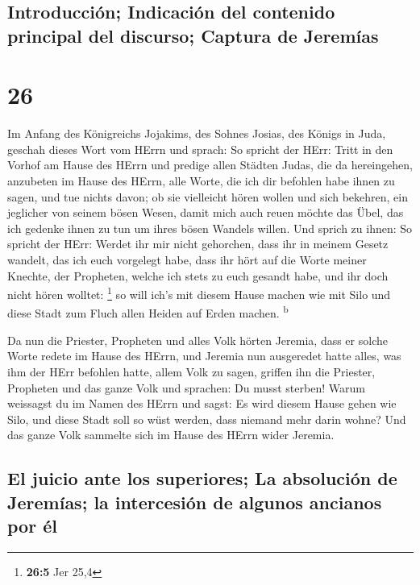 \hypertarget{introducciuxf3n-indicaciuxf3n-del-contenido-principal-del-discurso-captura-de-jeremuxedas}{%
\subsection{Introducción; Indicación del contenido principal del
discurso; Captura de
Jeremías}\label{introducciuxf3n-indicaciuxf3n-del-contenido-principal-del-discurso-captura-de-jeremuxedas}}

\hypertarget{section-25}{%
\section{26}\label{section-25}}

 Im Anfang des Königreichs Jojakims, des Sohnes Josias,
des Königs in Juda, geschah dieses Wort vom HErrn und sprach:
 So spricht der HErr: Tritt in den Vorhof am Hause des
HErrn und predige allen Städten Judas, die da hereingehen, anzubeten im
Hause des HErrn, alle Worte, die ich dir befohlen habe ihnen zu sagen,
und tue nichts davon;  ob sie vielleicht hören wollen und
sich bekehren, ein jeglicher von seinem bösen Wesen, damit mich auch
reuen möchte das Übel, das ich gedenke ihnen zu tun um ihres bösen
Wandels willen.  Und sprich zu ihnen: So spricht der HErr:
Werdet ihr mir nicht gehorchen, dass ihr in meinem Gesetz wandelt, das
ich euch vorgelegt habe,  dass ihr hört auf die Worte
meiner Knechte, der Propheten, welche ich stets zu euch gesandt habe,
und ihr doch nicht hören wolltet: \footnote{\textbf{26:5} Jer 25,4}
 so will ich's mit diesem Hause machen wie mit Silo und
diese Stadt zum Fluch allen Heiden auf Erden machen. \textsuperscript{b}

 Da nun die Priester, Propheten und alles Volk hörten
Jeremia, dass er solche Worte redete im Hause des HErrn, 
und Jeremia nun ausgeredet hatte alles, was ihm der HErr befohlen hatte,
allem Volk zu sagen, griffen ihn die Priester, Propheten und das ganze
Volk und sprachen: Du musst sterben!  Warum weissagst du
im Namen des HErrn und sagst: Es wird diesem Hause gehen wie Silo, und
diese Stadt soll so wüst werden, dass niemand mehr darin wohne? Und das
ganze Volk sammelte sich im Hause des HErrn wider Jeremia.

\hypertarget{el-juicio-ante-los-superiores-la-absoluciuxf3n-de-jeremuxedas-la-intercesiuxf3n-de-algunos-ancianos-por-uxe9l}{%
\subsection{El juicio ante los superiores; La absolución de Jeremías; la
intercesión de algunos ancianos por
él}\label{el-juicio-ante-los-superiores-la-absoluciuxf3n-de-jeremuxedas-la-intercesiuxf3n-de-algunos-ancianos-por-uxe9l}}

